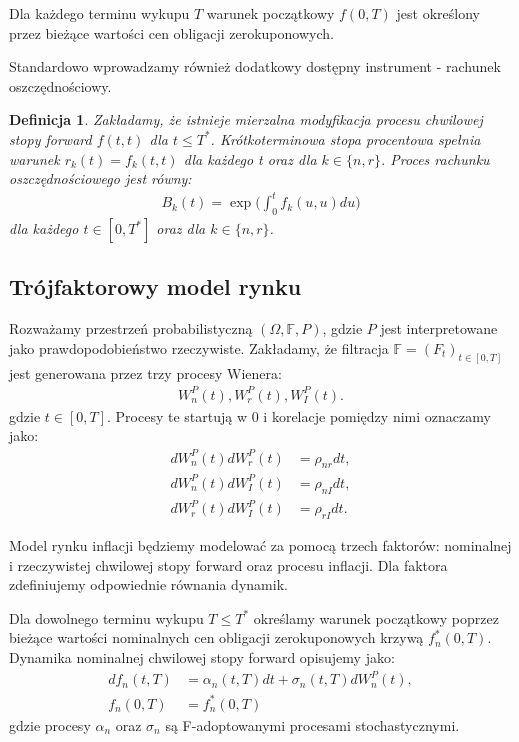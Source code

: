 \documentclass{mini}
\theoremstyle{mythstyle}
\newtheorem{Definicja}{Definicja}[chapter]
\begin{document}
	Dla każdego terminu wykupu $T$ warunek początkowy $f(0,T)$ jest określony przez bieżące wartości cen obligacji zerokuponowych.  
	
	Standardowo wprowadzamy również dodatkowy dostępny instrument - rachunek oszczędnościowy. \\
	\begin{Definicja}
		Zakładamy, że istnieje mierzalna modyfikacja procesu chwilowej stopy forward $f(t,t)$ dla $t \le T^*$. Krótkoterminowa stopa procentowa spełnia warunek $r_k(t) = f_k(t,t)$ dla każdego t oraz dla $k \in \{n,r\}$. Proces rachunku oszczędnościowego jest równy:
		\begin{eqnarray*}
			B_k(t) = \exp \bigg( \int_0^t f_k(u,u) du \bigg)
		\end{eqnarray*}
		dla każdego $t \in [0,T^*] $ oraz dla $k \in \{n,r\}$. 
	\end{Definicja}

	
	\subsection*{Trójfaktorowy model rynku}
	
	Rozważamy przestrzeń probabilistyczną  $(\Omega,\mathbb{F},P)$, gdzie $P$ jest interpretowane jako prawdopodobieństwo rzeczywiste. Zakładamy, że filtracja $\mathbb{F} = (F_t)_{t \in [0,T]}$ jest generowana przez trzy procesy Wienera:
	 \begin{eqnarray*}
		 W_n^P(t), W_r^P(t), W_I^P(t).
	\end{eqnarray*}
	 gdzie $t \in [0,T]$. Procesy te startują w 0 i korelacje pomiędzy nimi oznaczamy jako:
	\begin{align*}
		 dW_n^P(t) dW_r^P(t) &= \rho_{nr}dt, \\
		 dW_n^P(t) dW_I^P(t) &= \rho_{nI}dt, \\
		 dW_r^P(t) dW_I^P(t) &= \rho_{rI}dt.
	\end{align*}
	
	Model rynku inflacji będziemy modelować za pomocą trzech faktorów: nominalnej i rzeczywistej chwilowej stopy forward oraz procesu inflacji. Dla faktora zdefiniujemy odpowiednie równania dynamik.
	
	Dla dowolnego terminu wykupu $T \le T^*$ określamy warunek początkowy poprzez bieżące wartości nominalnych cen obligacji zerokuponowych krzywą $f_n^*(0,T)$. Dynamika nominalnej chwilowej stopy forward opisujemy jako:
	\begin{align*}
		df_n(t,T) &= \alpha_n(t,T)dt + \sigma_n(t,T) dW_n^P(t),\\
		f_n(0,T)  &= f_n^*(0,T)
	\end{align*}
	gdzie procesy $\alpha_n$ oraz $\sigma_n$ są F-adoptowanymi procesami stochastycznymi.
		
\end{document}
